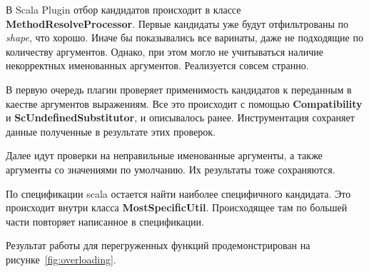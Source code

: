 В Scala Plugin отбор кандидатов происходит в классе
\textbf{MethodResolveProcessor}.
Первые кандидаты уже будут отфильтрованы по \textit{shape}, что хорошо.
Иначе бы показывались все варинаты, даже не подходящие по количеству аргументов.
Однако, при этом могло не учитываться наличие некорректных именованных аргументов.
Реализуется совсем странно.

В первую очередь плагин проверяет применимость кандидатов к переданным в
каестве аргументов выражениям.
Все это происходит с помощью \textbf{Compatibility} и
\textbf{ScUndefinedSubstitutor}, и описывалось ранее.
Инструментация сохраняет данные полученные в результате этих проверок.

Далее идут проверки на неправильные именованные аргументы,
а также аргументы со значениями по умолчанию.
Их результаты тоже сохраняются.

По спецификации scala остается найти наиболее специфичного кандидата.
Это происходит внутри класса \textbf{MostSpecificUtil}.
Происходящее там по большей части повторяет написанное в спецификации.

Результат работы для перегруженных функций продемонстрирован на
рисунке~\ref{fig:overloading}.
